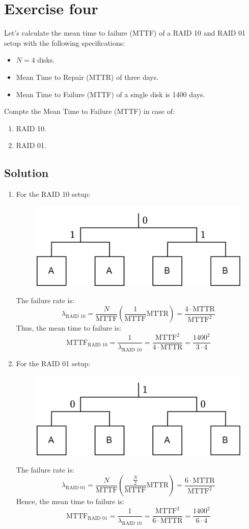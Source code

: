 \section{Exercise four}

Let's calculate the mean time to failure (MTTF) of a RAID 10 and RAID 01 setup with the following specifications:
\begin{itemize}
    \item $N=4$ disks.
    \item Mean Time to Repair (MTTR) of three days.
    \item Mean Time to Failure (MTTF) of a single disk is 1400 days.
\end{itemize}
Compte the Mean Time to Failure (MTTF) in case of:
\begin{enumerate}
    \item RAID 10. 
    \item RAID 01. 
\end{enumerate}

\subsection*{Solution}
\begin{enumerate}
    \item For the RAID 10 setup:
        \begin{figure}[H]
            \centering
            \includegraphics[width=0.5\linewidth]{images/410.png}
        \end{figure}
        The failure rate is:
        \[\lambda_{\text{RAID 10}}=\dfrac{N}{\text{MTTF}}\left(\dfrac{1}{\text{MTTF}}\text{MTTR}\right)=\dfrac{4\cdot\text{MTTR}}{\text{MTTF}^2}\]
        Thus, the mean time to failure is:
        \[\text{MTTF}_{\text{RAID 10}}=\dfrac{1}{\lambda_{\text{RAID 10}}}=\dfrac{\text{MTTF}^2}{4\cdot\text{MTTR}}=\dfrac{1400^2}{3\cdot 4}\]
    \item For the RAID 01 setup:
        \begin{figure}[H]
            \centering
            \includegraphics[width=0.5\linewidth]{images/401.png}
        \end{figure}
        The failure rate is:
        \[\lambda_{\text{RAID 01}}=\dfrac{N}{\text{MTTF}}\left(\dfrac{\frac{N}{2}}{\text{MTTF}}\text{MTTR}\right)=\dfrac{6\cdot\text{MTTR}}{\text{MTTF}^2}\]
        Hence, the mean time to failure is:
        \[\text{MTTF}_{\text{RAID 01}}=\dfrac{1}{\lambda_{\text{RAID 10}}}=\dfrac{\text{MTTF}^2}{6\cdot\text{MTTR}}=\dfrac{1400^2}{6\cdot 4}\]
\end{enumerate}